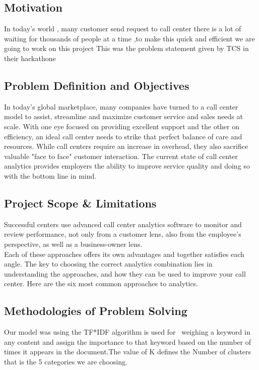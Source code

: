 \subsection{\textbf{Motivation}}
In today's world , many customer send request to call center there is a lot of waiting for thousands of people at a time ,to make this quick and efficient we are going to work on this project
This was the problem statement given by TCS in their hackathone

\subsection{\textbf{Problem Definition and Objectives }}
In today's global marketplace, many companies have turned to a call center model to assist, streamline and maximize customer service and sales needs at scale. With one eye focused on providing excellent support and the other on efficiency, an ideal call center needs to strike that perfect balance of care and resources. While call centers require an increase in overhead, they also sacrifice valuable "face to face" customer interaction. The current state of call center analytics provides employers the ability to improve service quality and doing so with the bottom line in mind.
\subsection{\textbf{Project Scope \& Limitations }}
Successful centers use advanced call center analytics software to monitor and review performance, not only from a customer lens, also from the employee’s perspective, as well as a business-owner lens.\\

Each of these approaches offers its own advantages and together satisfies each angle. The key to choosing the correct analytics combination lies in understanding the approaches, and how they can be used to improve your call center. Here are the six most common approaches to analytics.


\subsection{\textbf{Methodologies of Problem Solving  }}
Our model was using the TF*IDF algorithm is used for  weighing a keyword in any content and assign the importance to that keyword based on the number of times it appears in the document.The value of K defines the Number of clusters that is the 5 categories we are choosing.



\newpage
